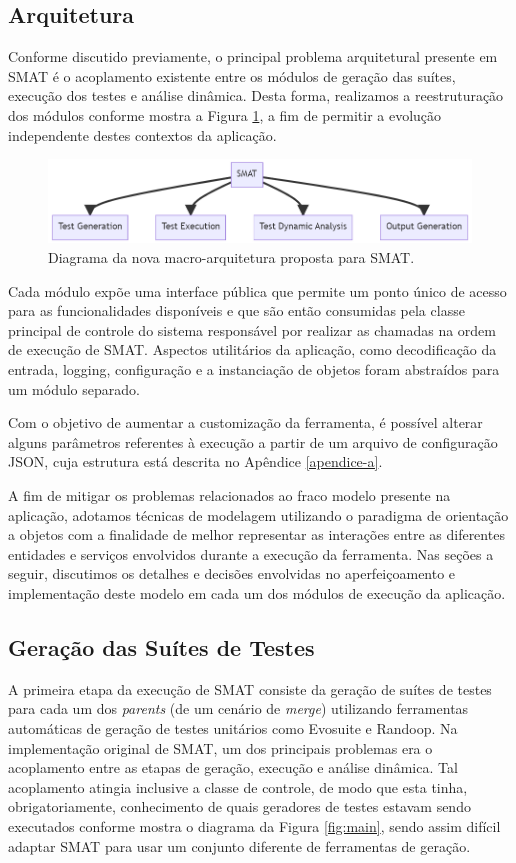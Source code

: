 \documentclass[12pt]{article}
\begin{document}
\subsection{Arquitetura}
Conforme discutido previamente, o principal problema arquitetural presente em SMAT é o acoplamento existente entre os módulos de geração das suítes, execução dos testes e análise dinâmica. Desta forma, realizamos a reestruturação dos módulos conforme mostra a Figura \ref{fig:macro}, a fim de permitir a evolução independente destes contextos da aplicação.

\begin{figure}[H]
    \centering
    \includegraphics[width=\textwidth]{macro.png}
    \caption{Diagrama da nova macro-arquitetura proposta para SMAT.}
    \label{fig:macro}
\end{figure}

Cada módulo expõe uma interface pública que permite um ponto único de acesso para as funcionalidades disponíveis e que são então consumidas pela classe principal de controle do sistema responsável por realizar as chamadas na ordem de execução de SMAT. Aspectos utilitários da aplicação, como decodificação da entrada, logging, configuração e a instanciação de objetos foram abstraídos para um módulo separado.

Com o objetivo de aumentar a customização da ferramenta, é possível alterar alguns parâmetros referentes à execução a partir de um arquivo de configuração JSON, cuja estrutura está descrita no Apêndice \ref{apendice-a}.

A fim de mitigar os problemas relacionados ao fraco modelo presente na aplicação, adotamos técnicas de modelagem utilizando o paradigma de orientação a objetos com a finalidade de melhor representar as interações entre as diferentes entidades e serviços envolvidos durante a execução da ferramenta. Nas seções a seguir, discutimos os detalhes e decisões envolvidas no aperfeiçoamento e implementação deste modelo em cada um dos módulos de execução da aplicação.

\subsection{Geração das Suítes de Testes}
A primeira etapa da execução de SMAT consiste da geração de suítes de testes para cada um dos \textit{parents} (de um cenário de \textit{merge}) utilizando ferramentas automáticas de geração de testes unitários como Evosuite e Randoop. Na implementação original de SMAT, um dos principais problemas era o acoplamento entre as etapas de geração, execução e análise dinâmica. Tal acoplamento atingia inclusive a classe de controle, de modo que esta tinha, obrigatoriamente, conhecimento de quais geradores de testes estavam sendo executados conforme mostra o diagrama da Figura \ref{fig:main}, sendo assim difícil adaptar SMAT para usar um conjunto diferente de ferramentas de geração.
\end{document}
